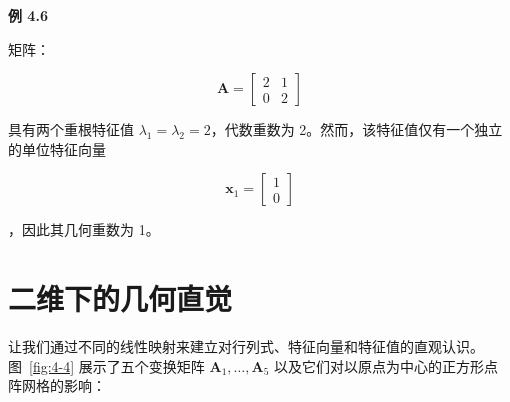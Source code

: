 \begin{notebox}
\textbf{例 4.6}
\end{notebox}

\begin{notebox}
矩阵：

\begin{equation*}
\boldsymbol{A} = \begin{bmatrix} 2 & 1 \\ 0 & 2 \end{bmatrix}
\end{equation*}

具有两个重根特征值 $ \lambda_1 = \lambda_2 = 2 $，代数重数为 2。然而，该特征值仅有一个独立的单位特征向量

\begin{equation*}
\boldsymbol{x}_1 = \begin{bmatrix} 1 \\ 0 \end{bmatrix}
\end{equation*}

，因此其几何重数为 1。
\end{notebox}

\section*{二维下的几何直觉}

让我们通过不同的线性映射来建立对行列式、特征向量和特征值的直观认识。图~\ref{fig:4-4} 展示了五个变换矩阵 $ \boldsymbol{A}_1, \ldots, \boldsymbol{A}_5 $ 以及它们对以原点为中心的正方形点阵网格的影响：

